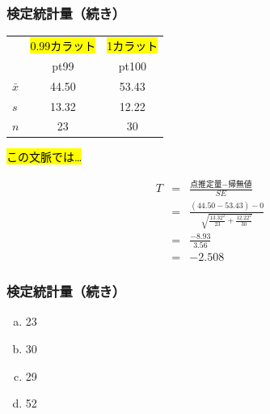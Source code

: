 
\begin{frame}
\frametitle{検定統計量（続き）}

{\small
\begin{center}
\begin{tabular}{l | c | c}
		& {\footnotesize \hl{0.99カラット}} &  {\footnotesize \hl{1カラット}}  \\
		& pt99	& pt100 \\
\hline
$\bar{x}$	& 44.50		& 53.43 \\
$s$		& 13.32		& 12.22 \\
$n$		& 23			& 30
\end{tabular}
\end{center}
}

\hl{この文脈では…}

{\small
\begin{eqnarray*}
T &=& \frac{\text{点推定量} - \text{帰無値} }{SE} \\
&=& \frac{(44.50 - 53.43) - 0}{ \sqrt{\frac{13.32^2}{23} + \frac{12.22^2}{30} }} \\
&=& \frac{-8.93}{3.56} \\
&=& -2.508
\end{eqnarray*}
}

\end{frame}


\begin{frame}
\frametitle{検定統計量（続き）}


{
\begin{enumerate}[(a)]
\item 23
\item 30
\item 29
\item 52
\end{enumerate}
}
{
}

\end{frame}



